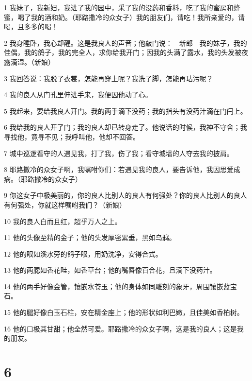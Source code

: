 \par 1 我妹子，我新妇，我进了我的园中，采了我的没药和香料，吃了我的蜜房和蜂蜜，喝了我的酒和奶。（耶路撒冷的众女子）我的朋友们，请吃！我所亲爱的，请喝，且多多的喝！
\par 2 我身睡卧，我心却醒。这是我良人的声音；他敲门说：　新郎　我的妹子，我的佳偶，我的鸽子，我的完全人，求你给我开门；因我的头满了露水，我的头发被夜露滴湿。（新娘）
\par 3 我回答说：我脱了衣裳，怎能再穿上呢？我洗了脚，怎能再玷污呢？
\par 4 我的良人从门孔里伸进手来，我便因他动了心。
\par 5 我起来，要给我良人开门。我的两手滴下没药；我的指头有没药汁滴在门闩上。
\par 6 我给我的良人开了门；我的良人却已转身走了。他说话的时候，我神不守舍；我寻找他，竟寻不见；我呼叫他，他却不回答。
\par 7 城中巡逻看守的人遇见我，打了我，伤了我；看守城墙的人夺去我的披肩。
\par 8 耶路撒冷的众女子啊，我嘱咐你们：若遇见我的良人，要告诉他，我因思爱成病。（耶路撒冷的众女子）
\par 9 你这女子中极美丽的，你的良人比别人的良人有何强处？你的良人比别人的良人有何强处，你就这样嘱咐我们？（新娘）
\par 10 我的良人白而且红，超乎万人之上。
\par 11 他的头像至精的金子；他的头发厚密累垂，黑如乌鸦。
\par 12 他的眼如溪水旁的鸽子眼，用奶洗净，安得合式。
\par 13 他的两腮如香花畦，如香草台；他的嘴唇像百合花，且滴下没药汁。
\par 14 他的两手好像金管，镶嵌水苍玉；他的身体如同雕刻的象牙，周围镶嵌蓝宝石。
\par 15 他的腿好像白玉石柱，安在精金座上；他的形状如利巴嫩，且佳美如香柏树。
\par 16 他的口极其甘甜；他全然可爱。耶路撒冷的众女子啊，这是我的良人；这是我的朋友。

\chapter{6}


